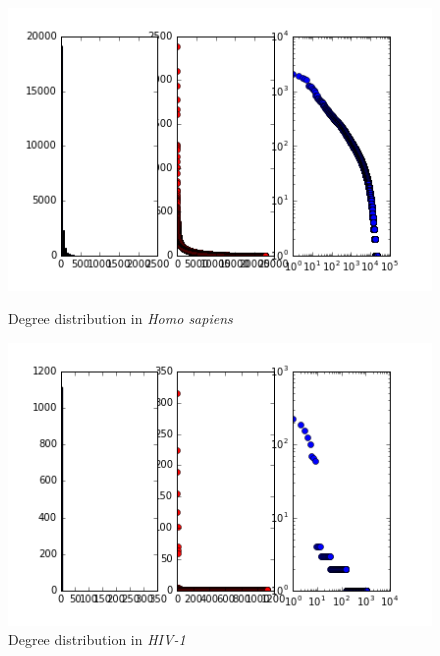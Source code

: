 \begin{figure}[h]
	\begin{minipage}{0.51\textwidth}
		\includegraphics[width=\textwidth]{Graphics/Homo_sapiens-DD.png}
        \caption{Degree distribution in \textit{Homo sapiens}}
        \label{fig:DD_Hs}
	\end{minipage}
	\begin{minipage}{0.51\textwidth}
		\flushleft
		\includegraphics[width=\textwidth]{Graphics/Human_Immunodeficiency_Virus_1-DD}
        \caption{Degree distribution in \textit{HIV-1}}
		\label{fig:DD_HIV}
	\end{minipage}
\end{figure}

